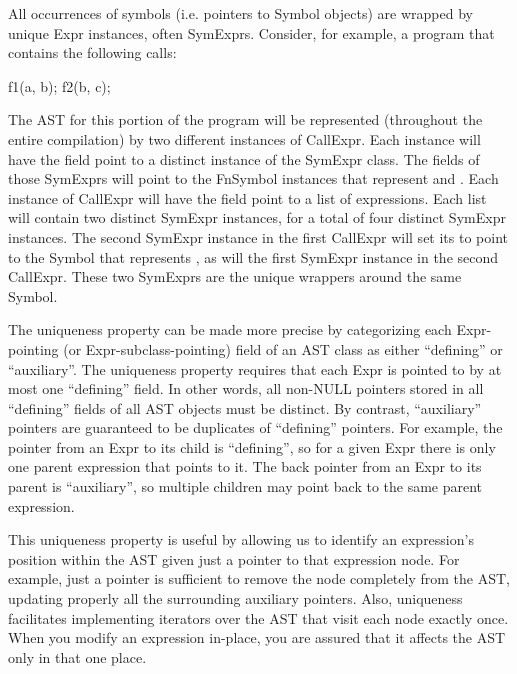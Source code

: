 \documentclass[10pt]{article}
\begin{document}
All occurrences of symbols (i.e. pointers to Symbol objects) are
wrapped by unique Expr instances, often SymExprs.  Consider, for example,
a program that contains the following calls:
\begin{chapel}
f1(a, b);
f2(b, c);
\end{chapel}
The AST for this portion of the program will be represented
(throughout the entire compilation) by two different instances of
CallExpr.  Each instance will have the  field point to a
distinct instance of the SymExpr class.  The  fields of those SymExprs will
point to the FnSymbol instances that represent  and
.  Each instance of CallExpr will have the  field
point to a list of expressions.  Each list will contain two distinct
SymExpr instances, for a total of four distinct SymExpr instances.
The second SymExpr instance in the first CallExpr will set its  to
point to the Symbol that represents , as will the first
SymExpr instance in the second CallExpr.
These two SymExprs are the unique wrappers around the same Symbol.

The uniqueness property can be made more precise by categorizing each
Expr-pointing (or Expr-subclass-pointing) field of an AST class as
either ``defining'' or ``auxiliary''.  The uniqueness property
requires that each Expr is pointed to by at most one ``defining'' field.
In other words, all non-NULL pointers stored in all ``defining'' fields of all
AST objects must be distinct.  By contrast, ``auxiliary'' pointers
are guaranteed to be duplicates of ``defining'' pointers.
For example, the pointer from an Expr to its child is ``defining'', so
for a given Expr there is only one parent expression that points to
it.  The back pointer from an Expr to its parent is ``auxiliary'', so
multiple children may point back to the same parent expression.

This uniqueness property is useful by allowing us to identify an
expression's position within the AST given just a pointer to that
expression node.  For example, just a pointer is sufficient to remove
the node completely from the AST, updating properly all the
surrounding auxiliary pointers. Also, uniqueness facilitates
implementing iterators over the AST that visit each node exactly once.
When you modify an expression in-place, you are assured that it
affects the AST only in that one place.
\end{document}
